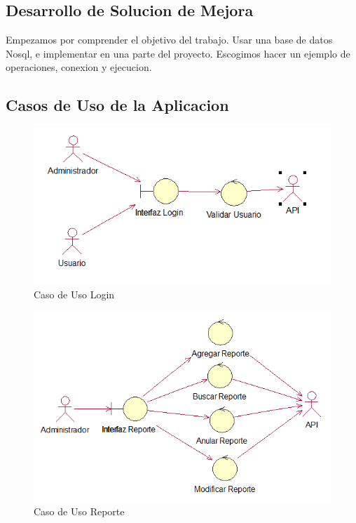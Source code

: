 \documentclass[twoside,twocolumn]{article}
\begin{document}
\begin{itemize}
\clearpage
\section{Desarrollo de Solucion de Mejora}
Empezamos por comprender el objetivo del trabajo. Usar una base de datos Nosql, e implementar en una parte del proyecto.
Escogimos hacer un ejemplo de operaciones, conexion y ejecucion.
\subsection{Casos de Uso de la Aplicacion}

\begin{figure}[h!]
\centering
\includegraphics[scale=0.45]{Image/Caso de Uso Login.PNG}
\caption{Caso de Uso Login}
\label{fig:Csha3}
\end{figure}

\begin{figure}[h!]
\centering
\includegraphics[scale=0.45]{Image/Caso de Uso Reporte.PNG}
\caption{Caso de Uso Reporte}
\label{fig:Csha3}
\end{figure}


\end{itemize}
\end{document}
